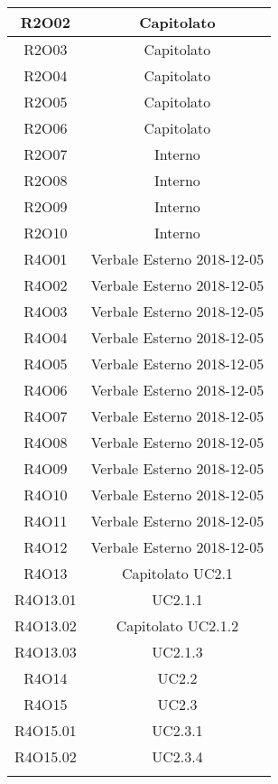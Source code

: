 \begin{tabularx}{\textwidth}{|C|C|}
	\hline
	R2O02&Capitolato\\
	\hline
	R2O03&Capitolato\\
	\hline
	R2O04&Capitolato\\
	\hline
	R2O05&Capitolato\\
	\hline
	R2O06&Capitolato\\
	\hline
	R2O07&Interno\\
	\hline
	R2O08&Interno\\
	\hline
	R2O09&Interno\\
	\hline
	R2O10&Interno\\
	\hline
	R4O01&Verbale Esterno 2018-12-05\\
	\hline
	R4O02&Verbale Esterno 2018-12-05\\
	\hline
	R4O03&Verbale Esterno 2018-12-05\\
	\hline
	R4O04&Verbale Esterno 2018-12-05\\
	\hline
	R4O05&Verbale Esterno 2018-12-05\\
	\hline
	R4O06&Verbale Esterno 2018-12-05\\
	\hline
	R4O07&Verbale Esterno 2018-12-05\\
	\hline
	R4O08&Verbale Esterno 2018-12-05\\
	\hline
	R4O09&Verbale Esterno 2018-12-05\\
	\hline
	R4O10&Verbale Esterno 2018-12-05\\
	\hline
	R4O11&Verbale Esterno 2018-12-05\\
	\hline
	R4O12&Verbale Esterno 2018-12-05\\
	\hline
	R4O13&Capitolato  UC2.1\\
	\hline
	R4O13.01& UC2.1.1\\
	\hline
	R4O13.02&Capitolato UC2.1.2\\
	\hline
	R4O13.03&UC2.1.3\\
	\hline
	R4O14&UC2.2\\
	\hline
	R4O15&UC2.3\\
	\hline
	R4O15.01&UC2.3.1\\
	\hline
	R4O15.02&UC2.3.4\\
	\hline
	\caption{Tabella requisiti-fonti}
\end{tabularx}